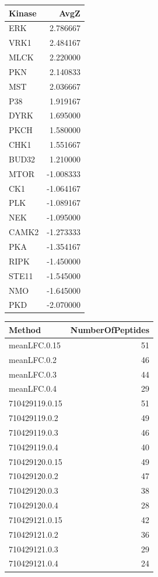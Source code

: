 \documentclass[
  letterpaper,
  DIV=11,
  numbers=noendperiod]{scrreport}
\begin{document}
\begin{longtable}[]{@{}lr@{}}
\toprule()
Kinase & AvgZ \\
\midrule()
\endhead
ERK & 2.786667 \\
VRK1 & 2.484167 \\
MLCK & 2.220000 \\
PKN & 2.140833 \\
MST & 2.036667 \\
P38 & 1.919167 \\
DYRK & 1.695000 \\
PKCH & 1.580000 \\
CHK1 & 1.551667 \\
BUD32 & 1.210000 \\
MTOR & -1.008333 \\
CK1 & -1.064167 \\
PLK & -1.089167 \\
NEK & -1.095000 \\
CAMK2 & -1.273333 \\
PKA & -1.354167 \\
RIPK & -1.450000 \\
STE11 & -1.545000 \\
NMO & -1.645000 \\
PKD & -2.070000 \\
\bottomrule()
\end{longtable}

\begin{longtable}[]{@{}lr@{}}
\toprule()
Method & NumberOfPeptides \\
\midrule()
\endhead
meanLFC.0.15 & 51 \\
meanLFC.0.2 & 46 \\
meanLFC.0.3 & 44 \\
meanLFC.0.4 & 29 \\
710429119.0.15 & 51 \\
710429119.0.2 & 49 \\
710429119.0.3 & 46 \\
710429119.0.4 & 40 \\
710429120.0.15 & 49 \\
710429120.0.2 & 47 \\
710429120.0.3 & 38 \\
710429120.0.4 & 28 \\
710429121.0.15 & 42 \\
710429121.0.2 & 36 \\
710429121.0.3 & 29 \\
710429121.0.4 & 24 \\
\bottomrule()
\end{longtable}
\end{document}
